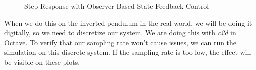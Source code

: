\documentclass{article}
\begin{document}
\begin{figure}
\centering
{}
\caption{Step Response with Observer Based State Feedback Control}
\end{figure}

When we do this on the inverted pendulum in the real world, we will be doing it digitally, so we need to discretize our system. We are doing this with \textit{c2d} in Octave. To verify that our sampling rate won't cause issues, we can run the simulation on this discrete system. If the sampling rate is too low, the effect will be visible on these plots.
\end{document}
